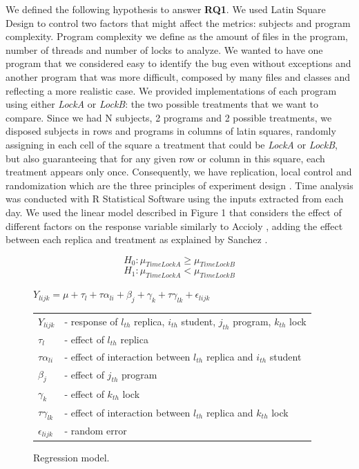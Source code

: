 We defined the following hypothesis to answer {\bf RQ1}. We used Latin Square Design to control two factors that might affect the metrics: subjects and program complexity.
Program complexity we define as the amount of files in the program, number of threads and number of locks to analyze. We wanted to have one program that we considered easy to identify the bug even without exceptions and another program that was more difficult, composed by many files and classes and reflecting a more realistic case. We provided implementations of each program using either \emph{LockA} or \emph{LockB}: the two possible treatments that we want to compare. Since we had N subjects, 2 programs and 2 possible treatments, we disposed subjects in rows and programs in columns of latin squares, randomly assigning in each cell of the square a treatment that could be \emph{LockA} or \emph{LockB}, but also guaranteeing that for any given row or column in this square, each treatment appears only once. Consequently, we have replication, local control and randomization which are the three principles of experiment design \cite{box}. Time analysis was conducted with R Statistical Software using the inputs extracted from each day. We used the linear model described in Figure 1 that considers the effect of different factors on the response variable similarly to Accioly \cite{paola}, adding the effect between each replica and treatment as explained by Sanchez \cite{sanchez}.

\begin{equation}
  H_{0} : \mu_{TimeLockA} \geq \mu_{TimeLockB}
\end{equation}
\begin{equation}
  H_{1} : \mu_{TimeLockA} < \mu_{TimeLockB}
\end{equation}

\begin{figure}
\begin{center}
$Y_{lijk} = \mu + \tau_{l} + \tau\alpha_{li} + \beta_{j} + \gamma_{k} + \tau\gamma_{lk} + \epsilon_{lijk}$\\
\vspace{4mm}
\begin{tabular}{ll}
$Y_{lijk}$ & - response of $l_{th}$ replica, $i_{th}$ student, $j_{th}$ program, $k_{th}$ lock \\
$\tau_{l}$ & - effect of $l_{th}$ replica \\
$\tau\alpha_{li}$ & - effect of interaction between $l_{th}$ replica and $i_{th}$ student \\
$\beta_{j}$ & - effect of $j_{th}$ program \\
$\gamma_{k}$ & - effect of $k_{th}$ lock \\
$\tau\gamma_{lk}$ & - effect of interaction between $l_{th}$ replica and $k_{th}$ lock \\
$\epsilon_{lijk}$ & - random error \\
\end{tabular}
\caption{Regression model.}
\end{center}
\end{figure}

